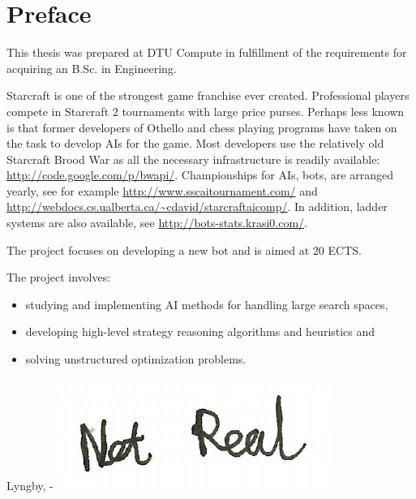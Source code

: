 \chapter{Preface}
This thesis was prepared at DTU Compute in fulfillment of the requirements for acquiring an B.Sc. in Engineering.

Starcraft is one of the strongest game franchise ever created. Professional players compete in Starcraft 2 tournaments with large price purses. Perhaps less known is that former developers of Othello and chess playing programs have taken on the task to develop AIs for the game. Most developers use the relatively old Starcraft Brood War as all the necessary infrastructure is readily available: \url{http://code.google.com/p/bwapi/}. Championships for AIs, bots, are arranged yearly, see for example \url{http://www.sscaitournament.com/} and \url{http://webdocs.cs.ualberta.ca/~cdavid/starcraftaicomp/}. In addition, ladder systems are also available, see \url{http://bots-stats.krasi0.com/}.

The project focuses on developing a new bot and is aimed at 20 ECTS.

The project involves:
\begin{itemize}
	\item studying and implementing AI methods for handling large search spaces,
	\item developing high-level strategy reasoning algorithms and heuristics and
	\item solving unstructured optimization problems.
\end{itemize}

\vspace{20mm}
\begin{center}
    \hspace{20mm} Lyngby, \thesishandin-\thesisyear
    \vspace{5mm}
    \newline
    \includegraphics[scale=0.5]{figures/SignatureDummy}
\end{center}
\begin{flushright}
    \thesisauthor
\end{flushright}

